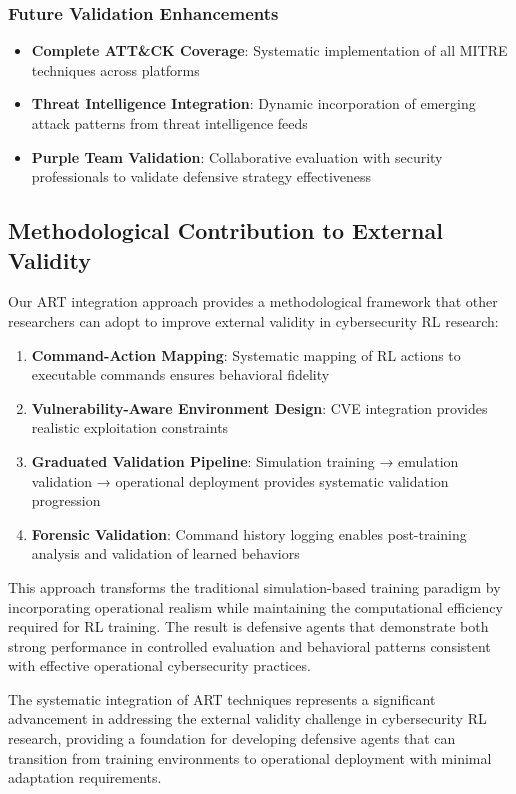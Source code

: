 \subsubsection{Future Validation Enhancements}

\begin{itemize}
    \item \textbf{Complete ATT\&CK Coverage}: Systematic implementation of all MITRE techniques across platforms
    \item \textbf{Threat Intelligence Integration}: Dynamic incorporation of emerging attack patterns from threat intelligence feeds
    \item \textbf{Purple Team Validation}: Collaborative evaluation with security professionals to validate defensive strategy effectiveness
\end{itemize}

\subsection{Methodological Contribution to External Validity}

Our ART integration approach provides a methodological framework that other researchers can adopt to improve external validity in cybersecurity RL research:

\begin{enumerate}
    \item \textbf{Command-Action Mapping}: Systematic mapping of RL actions to executable commands ensures behavioral fidelity
    
    \item \textbf{Vulnerability-Aware Environment Design}: CVE integration provides realistic exploitation constraints
    
    \item \textbf{Graduated Validation Pipeline}: Simulation training → emulation validation → operational deployment provides systematic validation progression
    
    \item \textbf{Forensic Validation}: Command history logging enables post-training analysis and validation of learned behaviors
\end{enumerate}

This approach transforms the traditional simulation-based training paradigm by incorporating operational realism while maintaining the computational efficiency required for RL training. The result is defensive agents that demonstrate both strong performance in controlled evaluation and behavioral patterns consistent with effective operational cybersecurity practices.

The systematic integration of ART techniques represents a significant advancement in addressing the external validity challenge in cybersecurity RL research, providing a foundation for developing defensive agents that can transition from training environments to operational deployment with minimal adaptation requirements.